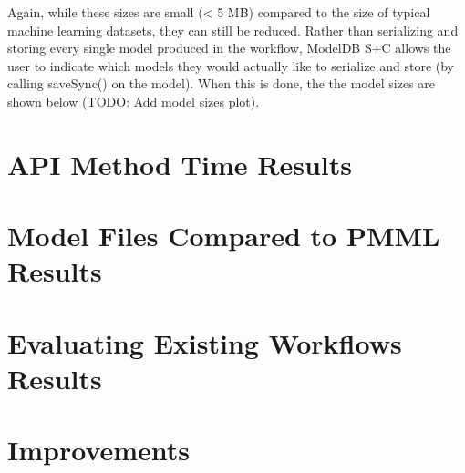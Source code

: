 Again, while these sizes are small (< 5 MB) compared to the size of typical machine learning
datasets, they can still be reduced. Rather than serializing and storing every single model produced in the 
workflow, ModelDB S+C allows the user to indicate which models they would actually like to serialize and store (by
calling saveSync() on the model). When this is done, the the model sizes are shown below (TODO: Add model sizes plot). 

\section{API Method Time Results}

\section{Model Files Compared to PMML Results}

\section{Evaluating Existing Workflows Results}

\section{Improvements}
